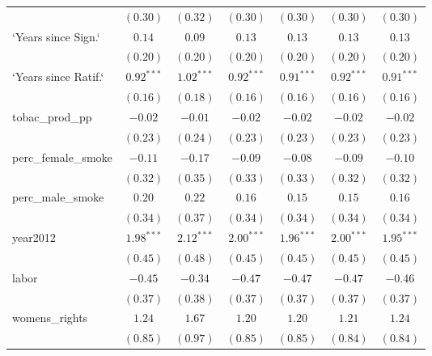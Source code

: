 \begin{table}[!h]
\begin{center}
\begin{tabular}{l c c c c c c }
                        & $(0.30)$     & $(0.32)$     & $(0.30)$     & $(0.30)$     & $(0.30)$     & $(0.30)$     \\
`Years since Sign.`     & $0.14$       & $0.09$       & $0.13$       & $0.13$       & $0.13$       & $0.13$       \\
                        & $(0.20)$     & $(0.20)$     & $(0.20)$     & $(0.20)$     & $(0.20)$     & $(0.20)$     \\
`Years since Ratif.`    & $0.92^{***}$ & $1.02^{***}$ & $0.92^{***}$ & $0.91^{***}$ & $0.92^{***}$ & $0.91^{***}$ \\
                        & $(0.16)$     & $(0.18)$     & $(0.16)$     & $(0.16)$     & $(0.16)$     & $(0.16)$     \\
tobac\_prod\_pp         & $-0.02$      & $-0.01$      & $-0.02$      & $-0.02$      & $-0.02$      & $-0.02$      \\
                        & $(0.23)$     & $(0.24)$     & $(0.23)$     & $(0.23)$     & $(0.23)$     & $(0.23)$     \\
perc\_female\_smoke     & $-0.11$      & $-0.17$      & $-0.09$      & $-0.08$      & $-0.09$      & $-0.10$      \\
                        & $(0.32)$     & $(0.35)$     & $(0.33)$     & $(0.33)$     & $(0.32)$     & $(0.32)$     \\
perc\_male\_smoke       & $0.20$       & $0.22$       & $0.16$       & $0.15$       & $0.15$       & $0.16$       \\
                        & $(0.34)$     & $(0.37)$     & $(0.34)$     & $(0.34)$     & $(0.34)$     & $(0.34)$     \\
year2012                & $1.98^{***}$ & $2.12^{***}$ & $2.00^{***}$ & $1.96^{***}$ & $2.00^{***}$ & $1.95^{***}$ \\
                        & $(0.45)$     & $(0.48)$     & $(0.45)$     & $(0.45)$     & $(0.45)$     & $(0.45)$     \\
labor                   & $-0.45$      & $-0.34$      & $-0.47$      & $-0.47$      & $-0.47$      & $-0.46$      \\
                        & $(0.37)$     & $(0.38)$     & $(0.37)$     & $(0.37)$     & $(0.37)$     & $(0.37)$     \\
womens\_rights          & $1.24$       & $1.67$       & $1.20$       & $1.20$       & $1.21$       & $1.24$       \\
                        & $(0.85)$     & $(0.97)$     & $(0.85)$     & $(0.85)$     & $(0.84)$     & $(0.84)$     \\

\end{tabular}
\end{center}
\end{table}
